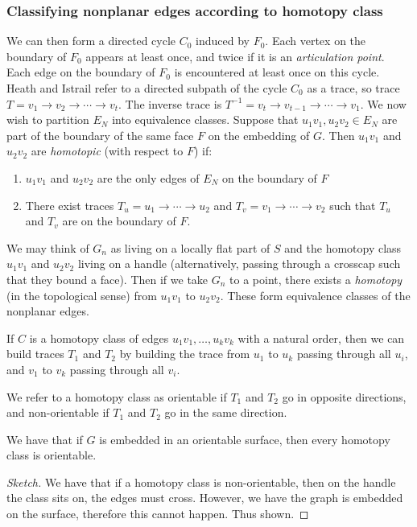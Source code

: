 \subsubsection{Classifying nonplanar edges according to homotopy class}

We can then form a directed cycle \(C_0\) induced by \(F_0\). Each vertex on the boundary of \(F_0\) appears at least once, and twice if it is an \textit{articulation point}. Each edge on the boundary of \(F_0\) is encountered at least once on this cycle. Heath and Istrail refer to a directed subpath of the cycle \(C_0\) as a trace, so trace \(T = v_1 \rightarrow v_2 \rightarrow \cdots \rightarrow v_t\). The inverse trace is \(T^{-1} = v_t \rightarrow v_{t-1} \rightarrow \cdots \rightarrow v_1\). We now wish to partition \(E_N\) into equivalence classes. Suppose that \(u_1v_1, u_2v_2 \in E_N\) are part of the boundary of the same face \(F\) on the embedding of \(G\). Then \(u_1v_1\) and \(u_2v_2\) are \textit{homotopic} (with respect to \(F\)) if:
\begin{enumerate}
	\item \(u_1v_1\) and \(u_2v_2\) are the only edges of \(E_N\) on the boundary of \(F\)
	\item There exist traces \(T_u = u_1 \rightarrow \cdots \rightarrow u_2\) and \(T_v = v_1 \rightarrow \cdots \rightarrow v_2\) such that \(T_u\) and \(T_v\) are on the boundary of \(F\).
\end{enumerate}
We may think of \(G_n\) as living on a locally flat part of \(S\) and the homotopy class \(u_1v_1\) and \(u_2 v_2\) living on a handle (alternatively, passing through a crosscap such that they bound a face). Then if we take \(G_n\) to a point, there exists a \textit{homotopy} (in the topological sense) from \(u_1v_1\) to \(u_2v_2\). These form equivalence classes of the nonplanar edges.

\begin{lemma}
	If \(C\) is a homotopy class of edges \(u_1 v_1, \ldots, u_k v_k\) with a natural order, then we can build traces \(T_1\) and \(T_2\) by building the trace from \(u_1\) to \(u_k\) passing through all \(u_i\), and \(v_1\) to \(v_k\) passing through all \(v_i\).
\end{lemma}
We refer to a homotopy class as orientable if \(T_1\) and \(T_2\) go in opposite directions, and non-orientable if \(T_1\) and \(T_2\) go in the same direction.

\begin{lemma}
	We have that if \(G\) is embedded in an orientable surface, then every homotopy class is orientable.
\end{lemma}
\begin{proof}[Sketch]
	We have that if a homotopy class is non-orientable, then on the handle the class sits on, the edges must cross. However, we have the graph is embedded on the surface, therefore this cannot happen. Thus shown.
\end{proof}

